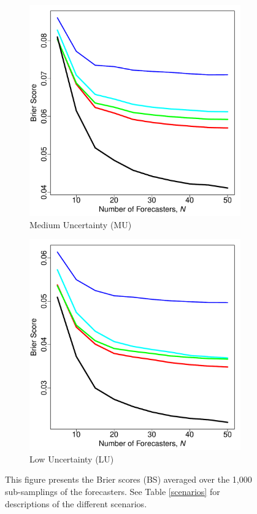 \documentclass[11pt]{article}
\theoremstyle{definition}
\theoremstyle{definition}
\begin{document}
\begin{figure}[t!]
\begin{subfigure}{0.32\textwidth}
                \includegraphics[width=\textwidth]{realMU}
                \caption{Medium Uncertainty (MU)}
                                \label{medUnc}
        \end{subfigure}
        \begin{subfigure}{0.32\textwidth}
                \includegraphics[width=\textwidth]{realLU}
                \caption{Low Uncertainty (LU)}
                                \label{lowUnc}
        \end{subfigure}             
        
        \caption{This figure presents the Brier scores (BS) averaged over the 1,000 sub-samplings of the forecasters. See Table \ref{scenarios} for descriptions of the different scenarios.}
        \label{simReal}
\end{figure}
\end{document}
